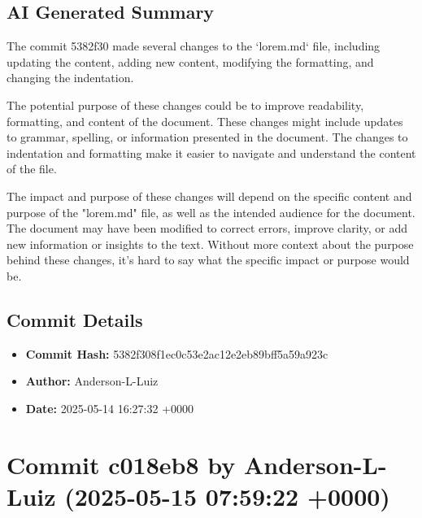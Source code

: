 \documentclass{article}
\begin{document}
\subsection{AI Generated Summary}
{\selectfont
 The commit 5382f30 made several changes to the `lorem.md` file, including updating the content, adding new content, modifying the formatting, and changing the indentation.

The potential purpose of these changes could be to improve readability, formatting, and content of the document. These changes might include updates to grammar, spelling, or information presented in the document. The changes to indentation and formatting make it easier to navigate and understand the content of the file.

The impact and purpose of these changes will depend on the specific content and purpose of the "lorem.md" file, as well as the intended audience for the document. The document may have been modified to correct errors, improve clarity, or add new information or insights to the text. Without more context about the purpose behind these changes, it's hard to say what the specific impact or purpose would be.
}
\subsection{Commit Details}
\begin{itemize}
    \item \textbf{Commit Hash:} 5382f308f1ec0c53e2ac12e2eb89bff5a59a923c
    \item \textbf{Author:} Anderson-L-Luiz
    \item \textbf{Date:} 2025-05-14 16:27:32 +0000
\end{itemize}
\hrulefill

\section{Commit c018eb8 by Anderson-L-Luiz (2025-05-15 07:59:22 +0000)}
\end{document}
